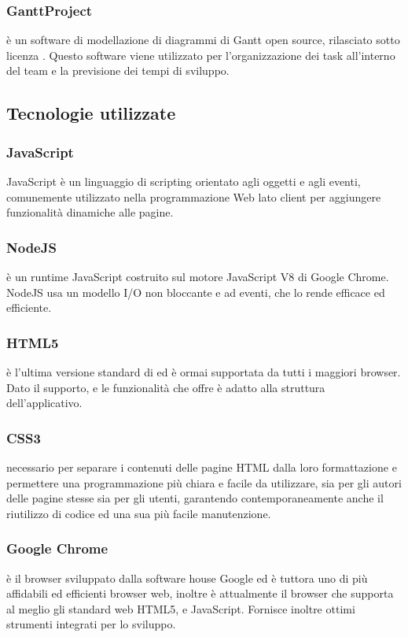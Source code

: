 \documentclass[../NormeDiProgetto.tex]{subfiles}
\begin{document}
            \subsubsection{GanttProject}
             è un software di modellazione di diagrammi di Gantt open source, rilasciato sotto licenza . Questo software viene utilizzato per l'organizzazione dei task all'interno del team e la previsione dei tempi di sviluppo.

      \subsection{Tecnologie utilizzate}
            \subsubsection{JavaScript}
            JavaScript è un linguaggio di scripting orientato agli oggetti e agli eventi, comunemente utilizzato nella programmazione Web lato client per aggiungere funzionalità dinamiche alle pagine.
            
            \subsubsection{NodeJS}
             è un runtime JavaScript costruito sul motore JavaScript V8 di Google Chrome. NodeJS usa un modello I/O non bloccante e ad eventi, che lo rende efficace ed efficiente.
            
            \subsubsection{HTML5}
             è l'ultima versione standard di  ed è ormai supportata da tutti i maggiori browser. Dato il supporto, e le funzionalità che offre è adatto alla struttura dell'applicativo.
            
            \subsubsection{CSS3}
             necessario per separare i contenuti delle pagine HTML dalla loro formattazione e permettere una programmazione più chiara e facile da utilizzare, sia per gli autori delle pagine stesse sia per gli utenti, garantendo contemporaneamente anche il riutilizzo di codice ed una sua più facile manutenzione.
      
            \subsubsection{Google Chrome}
             è il browser sviluppato dalla software house Google ed è tuttora uno di più affidabili ed efficienti browser web, inoltre è attualmente il browser che supporta al meglio gli standard web HTML5,  e JavaScript. Fornisce inoltre ottimi strumenti integrati per lo sviluppo.
\end{document}
